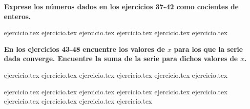 \vspace{0.3cm}
\noindent\textbf{Exprese los números dados en los ejercicios 37-42 como cocientes de enteros.}
\begin{enumerate}
    \setcounter{enumi}{36}
    {ejercicio.tex}
{ejercicio.tex}
{ejercicio.tex}
{ejercicio.tex}
{ejercicio.tex}
{ejercicio.tex}
\end{enumerate}

\vspace{0.3cm}
\noindent\textbf{En los ejercicios 43-48 encuentre los valores de $x$ para los que la serie dada converge. Encuentre la suma de la serie para dichos valores de $x$.}
\begin{enumerate}
    \setcounter{enumi}{42}
    {ejercicio.tex}
{ejercicio.tex}
{ejercicio.tex}
{ejercicio.tex}
{ejercicio.tex}
{ejercicio.tex}
\end{enumerate}

\vspace{0.5cm}
\begin{enumerate}
    \setcounter{enumi}{48}
    {ejercicio.tex}
{ejercicio.tex}
{ejercicio.tex}
{ejercicio.tex}
{ejercicio.tex}
{ejercicio.tex}
{ejercicio.tex}
{ejercicio.tex}
{ejercicio.tex}
{ejercicio.tex}
\end{enumerate}
